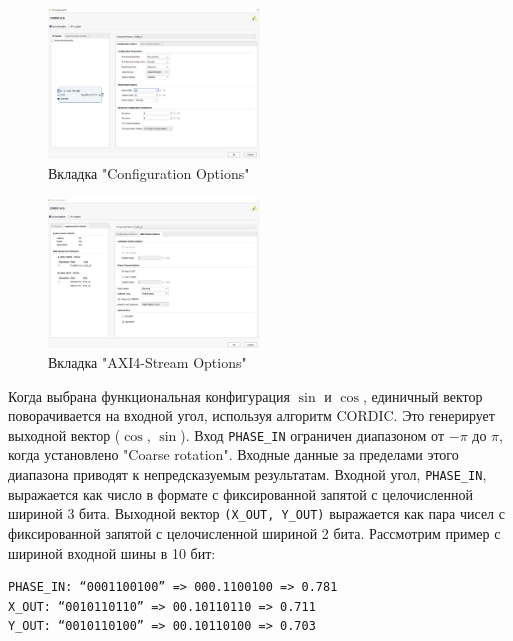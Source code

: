 \documentclass[a4paper,oneside ,10pt]{extreport}
\begin{document}
\begin{figure}[h]
	\centering
	\includegraphics[width=0.5\textwidth]{image/cordic_config_options.png}
	\caption{Вкладка "Configuration Options"}
	\label{cordic_config_options}
\end{figure}

\begin{figure}[h]
	\centering
	\includegraphics[width=0.5\textwidth]{image/cordic_axi4_stream_options.png}
	\caption{Вкладка "AXI4-Stream Options"}
	\label{cordic_axi4_stream_options}
\end{figure}

Когда выбрана функциональная конфигурация \(\sin\) и \(\cos\), единичный вектор поворачивается на входной угол, используя алгоритм CORDIC. Это генерирует выходной вектор (\(\cos\), \(\sin\)). Вход \verb|PHASE_IN| ограничен диапазоном от \(-\pi\) до \(\pi\), когда установлено "Coarse rotation". Входные данные за пределами этого диапазона приводят к непредсказуемым результатам. Входной угол, \verb|PHASE_IN|, выражается как число в формате с фиксированной запятой с целочисленной шириной 3 бита. Выходной вектор \verb|(X_OUT, Y_OUT)| выражается 
как пара чисел с фиксированной запятой с целочисленной шириной 2 бита.
Рассмотрим пример с шириной входной шины в 10 бит:

\begin{Verbatim}[tabsize=4]
PHASE_IN: “0001100100” => 000.1100100 => 0.781
X_OUT: “0010110110” => 00.10110110 => 0.711
Y_OUT: “0010110100” => 00.10110100 => 0.703
\end{Verbatim}
\end{document}

